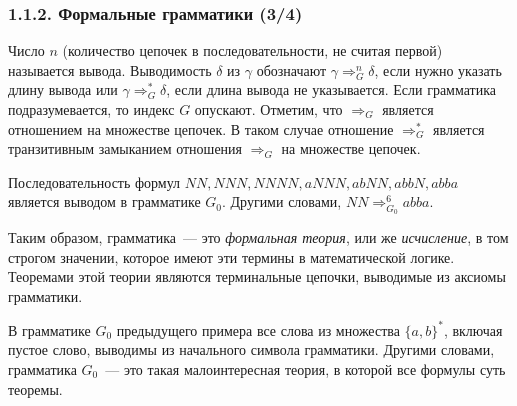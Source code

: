 \begin{frame}
\frametitle{1.1.2. Формальные грамматики (3/4)}

Число $n$ (количество цепочек в
последовательности, не считая первой) называется
 вывода. Выводимость $\delta$ из
$\gamma$ обозначают 
$\gamma\Rightarrow^n_G\delta$, если нужно
указать длину вывода или $\gamma\Rightarrow^*_G\delta$, если длина
вывода не указывается. Если грамматика подразумевается, то индекс
$G$ опускают.
Отметим, что $\Rightarrow_G$ является
отношением на множестве цепочек.
В таком случае отношение
 $\Rightarrow_{G}^{*}$ является транзитивным замыканием отношения $\Rightarrow_{G}$ на множестве цепочек.

\smallskip
\begin{example}
Последовательность формул $NN, NNN,  NNNN, aNNN, abNN, abbN, abba $ является выводом в грамматике $G_0$.
Другими словами, $NN\Rightarrow^6_{G_0} abba$.
\end{example}

\smallskip
\begin{remark}
Таким образом, грамматика~--- 
это {\em формальная теория}, или же
{\em исчисление}, в том строгом значении,
которое имеют эти термины в математической логике.
Теоремами этой теории являются терминальные цепочки, выводимые из аксиомы грамматики.   
\end{remark}

\smallskip
\begin{example}
В грамматике $G_0$ предыдущего примера
все слова из множества $\{a,b\}^*$, включая пустое слово, выводимы
из начального символа грамматики.
Другими словами, грамматика $G_0$~---
это такая малоинтересная теория,
в которой все формулы суть теоремы.   
\end{example}
\end{frame}

